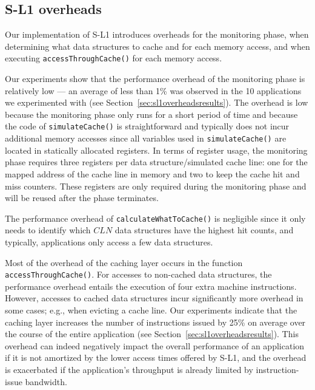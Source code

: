 \subsection{S-L1 overheads}
Our implementation of S-L1 introduces overheads for the monitoring phase, when determining what data structures to cache and for each memory access,
and when executing \texttt{accessThroughCache()} for each memory access.


Our experiments show that the performance overhead of the monitoring phase is relatively low --- an
average of less than 1\% was observed in the 10 applications we experimented with (see
Section~\ref{sec:sl1overheadsresults}). 
The overhead is low because the monitoring phase only runs for a short period of time and because
the code of \texttt{simulateCache()} is straightforward and typically does not incur additional
memory accesses since all variables used in \texttt{simulateCache()} are located in statically
allocated registers. 
In terms of register usage, the monitoring phase requires three registers per data structure/simulated
cache line: one for the mapped address of the cache line in memory and two to keep the cache hit and
miss counters. 
These registers are only required during the monitoring phase and will be reused after
the phase terminates.


The performance overhead of \texttt{calculateWhatToCache()} is
negligible since it only needs to identify which $CLN$ data structures have the highest hit counts,
and typically, applications only access a few data structures.

Most of the overhead of the caching layer occurs in the function \texttt{accessThroughCache()}. 
For accesses to non-cached data structures, the performance overhead entails
the execution of four extra machine instructions.
However, accesses to cached data structures incur significantly more overhead in some cases; e.g., when evicting a cache line.
Our experiments indicate that the caching layer increases the number of instructions issued by 25\%
on average over the course of the entire application (see Section~\ref{sec:sl1overheadsresults}).
This overhead can indeed negatively impact the overall performance of an application if it is not
amortized by the lower access times offered by S-L1, and the overhead is exacerbated if the
application's throughput is already limited by instruction-issue bandwidth.

